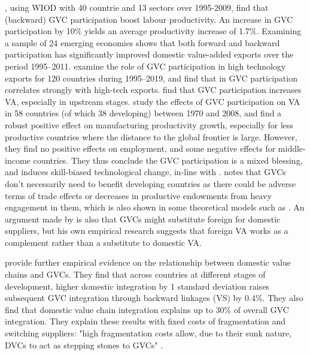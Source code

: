 \documentclass[a4paper]{article}
\begin{document}
\citet{constantinescu2019does}, using WIOD with 40 countrie and 13 sectors over 1995-2009, find that (backward) GVC participation boost labour productivity. An increase in GVC participation by 10\% yields an average productivity increase of 1.7\%. Examining a sample of 24 emerging economies \citet{jangam2021does} shows that both forward and backward participation has significantly improved domestic value-added exports over the period 1995–2011. \citet{altun2023does} examine the role of GVC participation in high technology exports for 120 countries during 1995–2019, and find that in GVC participation correlates strongly with high-tech exports. \citet{kummritz2017economic} find that GVC participation increases VA, especially in upstream stages. \citet{pahl2020global} study the effects of GVC participation on VA in 58 countries (of which 38 developing) between 1970 and 2008, and find a robust positive effect on manufacturing productivity growth, especially for less productive countries where the distance to the global frontier is large. However, they find no positive effects on employment, and some negative effects for middle-income countries. They thus conclude the GVC participation is a mixed blessing, and induces skill-biased technological change, in-line with \citet{rodrik2018new}. \citet{Kummritz20161} notes that GVCs don't necessarily need to benefit developing countries as there could be adverse terms of trade effects or decreases in productive endowments from heavy engagement in them, which is also shown in some theoretical models such as \citet{baldwin2014trade}. An argument made by \citet{kummritz2015global} is also that GVCs might substitute foreign for domestic suppliers, but his own empirical research suggests that foreign VA works as a complement rather than a substitute to domestic VA. \newline %
 
 \citet{beverelli2019domestic} provide further empirical evidence on the relationship between domestic value chains and GVCs. They find that across countries at different stages of development, higher domestic integration by 1 standard deviation raises subsequent GVC integration through backward linkages (VS) by 0.4\%. They also find that domestic value chain integration explains up to 30\% of overall GVC integration. They explain these results with fixed costs of fragmentation and switching suppliers: "high fragmentation costs allow, due to their sunk nature, DVCs to act as stepping stones to GVCs" \citep{beverelli2019domestic}. \newline %
\end{document}
